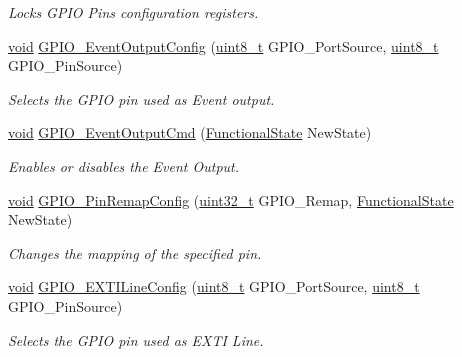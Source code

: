 \begin{DoxyCompactItemize}
\begin{DoxyCompactList}\small\item\em Locks G\-P\-I\-O Pins configuration registers. \end{DoxyCompactList}\item 
\hyperlink{group___n_a_m_e_ga18028b8badbf1ea7e704ccac3c488e82}{void} \hyperlink{group___g_p_i_o___private___functions_ga935f31ed7a86c6cb594cf34313b4b7af}{G\-P\-I\-O\-\_\-\-Event\-Output\-Config} (\hyperlink{stdint_8h_aba7bc1797add20fe3efdf37ced1182c5}{uint8\-\_\-t} G\-P\-I\-O\-\_\-\-Port\-Source, \hyperlink{stdint_8h_aba7bc1797add20fe3efdf37ced1182c5}{uint8\-\_\-t} G\-P\-I\-O\-\_\-\-Pin\-Source)
\begin{DoxyCompactList}\small\item\em Selects the G\-P\-I\-O pin used as Event output. \end{DoxyCompactList}\item 
\hyperlink{group___n_a_m_e_ga18028b8badbf1ea7e704ccac3c488e82}{void} \hyperlink{group___g_p_i_o___private___functions_gaf13ab3d59e467df44b492f1cdfe2f588}{G\-P\-I\-O\-\_\-\-Event\-Output\-Cmd} (\hyperlink{group___exported__types_gac9a7e9a35d2513ec15c3b537aaa4fba1}{Functional\-State} New\-State)
\begin{DoxyCompactList}\small\item\em Enables or disables the Event Output. \end{DoxyCompactList}\item 
\hyperlink{group___n_a_m_e_ga18028b8badbf1ea7e704ccac3c488e82}{void} \hyperlink{group___g_p_i_o___private___functions_ga64eb76f6211b840daf9829289df4208b}{G\-P\-I\-O\-\_\-\-Pin\-Remap\-Config} (\hyperlink{stdint_8h_a435d1572bf3f880d55459d9805097f62}{uint32\-\_\-t} G\-P\-I\-O\-\_\-\-Remap, \hyperlink{group___exported__types_gac9a7e9a35d2513ec15c3b537aaa4fba1}{Functional\-State} New\-State)
\begin{DoxyCompactList}\small\item\em Changes the mapping of the specified pin. \end{DoxyCompactList}\item 
\hyperlink{group___n_a_m_e_ga18028b8badbf1ea7e704ccac3c488e82}{void} \hyperlink{group___g_p_i_o___private___functions_ga8c1f13646d7418827378032a584da653}{G\-P\-I\-O\-\_\-\-E\-X\-T\-I\-Line\-Config} (\hyperlink{stdint_8h_aba7bc1797add20fe3efdf37ced1182c5}{uint8\-\_\-t} G\-P\-I\-O\-\_\-\-Port\-Source, \hyperlink{stdint_8h_aba7bc1797add20fe3efdf37ced1182c5}{uint8\-\_\-t} G\-P\-I\-O\-\_\-\-Pin\-Source)
\begin{DoxyCompactList}\small\item\em Selects the G\-P\-I\-O pin used as E\-X\-T\-I Line. \end{DoxyCompactList}\item 

\end{DoxyCompactItemize}
